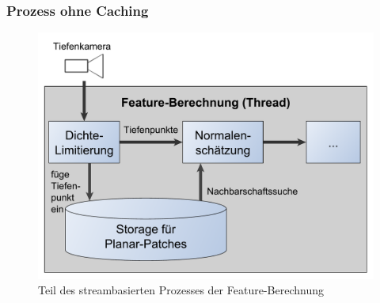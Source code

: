 \documentclass[presentation]{beamer}
\begin{document}
\begin{frame}
\frametitle{Prozess ohne Caching}
\begin{figure}
	\centering
	\includegraphics[width=0.7\linewidth]{figures/relatedWorks/FeatureEstimationProcessSimplified.pdf}
	\caption{Teil des streambasierten Prozesses der Feature-Berechnung}
	\label{fig:sub3} 
\end{figure}


\end{frame}

\end{document}
